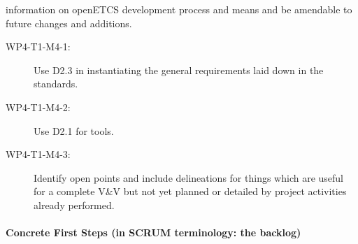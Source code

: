 \begin{description}
  information on openETCS development process and means and be
  amendable to future changes and additions.
  \begin{description}
  \item[WP4-T1-M4-1:] Use D2.3 in instantiating the general
    requirements laid down in the standards.
  \item[WP4-T1-M4-2:] Use D2.1 for tools.
  \item[WP4-T1-M4-3:] Identify open points and include delineations
    for things which are useful for a complete V\&V but not yet
    planned or detailed by project activities already performed.
  \end{description}
\end{description}

\paragraph{Concrete First Steps (in SCRUM terminology: the backlog)}
\label{sec:concrete-first-steps}

